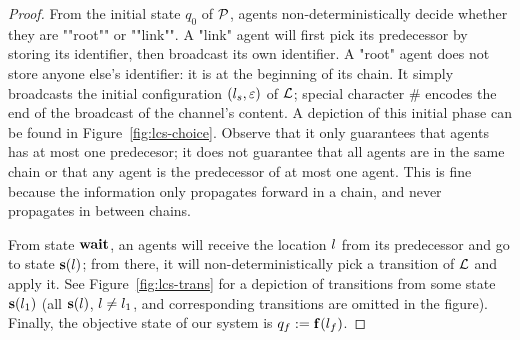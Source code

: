 \begin{proof}
	\AP From the initial state $q_0$ of $\mathcal{P}$, agents non-deterministically decide whether they are ""root"" or ""link"". 
	A "link" agent will first pick its predecessor by storing its identifier, then broadcast its own identifier.
	A "root" agent does not store anyone else's identifier: it is at the beginning of its chain. It simply broadcasts the initial configuration $(l_s,\varepsilon)$ of $\mathcal{L}$; special character $\#$ encodes the end of the broadcast of the channel's content.  A depiction of this initial phase can be found in Figure~\ref{fig:lcs-choice}.  
	Observe that it only guarantees that agents has at most one predecesor; it does not guarantee that all agents are in the same chain or that any agent is the predecessor of at most one agent. This is fine because the information only propagates forward in a chain, and never propagates in between chains. 

	From state $\mathbf{wait}$, an agents will receive the location $l$ from its predecessor and go to state $\mathbf{s}(l)$; from there, it will non-deterministically pick a transition of $\mathcal{L}$ and apply it. See Figure~\ref{fig:lcs-trans} for a depiction of transitions from some state $\mathbf{s}(l_1)$ (all $\mathbf{s}(l)$, $l \ne l_1$, and corresponding transitions are omitted in the figure). 
	Finally, the objective state of our system is $q_f := \mathbf{f}(l_f)$.


\end{proof}
